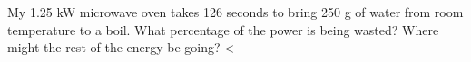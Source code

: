 My 1.25 kW microwave oven takes 126 seconds to bring
        250 g of water from room temperature to a boil. What
        percentage of the power is being wasted? Where might the
        rest of the energy be going?
        <%
